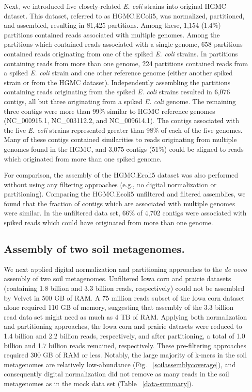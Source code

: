 \documentclass{pnastwo}
\begin{document}
\begin{article}
Next, we introduced five closely-related \emph{E. coli} strains into original
HGMC dataset. This dataset, referred to as HGMC.EColi5, was normalized,
partitioned, and assembled, resulting in 81,425 partitions. Among these, 1,154
(1.4\%) partitions contained reads associated with multiple genomes. Among the
partitions which contained reads associated with a single genome, 658 partitions
contained reads originating from one of the spiked \emph{E. coli} strains. In
partitions containing reads from more than one genome, 224 partitions contained
reads from a spiked \emph{E. coli} strain and one other reference genome (either
another spiked strain or from the HGMC dataset). Independently assembling the
partitions containing reads originating from the spiked \emph{E. coli} strains
resulted in 6,076 contigs, all but three originating from a spiked \emph{E.
coli} genome. The remaining three contigs were more than 99\% similar to HGMC
reference genomes (NC\_000915.1, NC\_003112.2, and NC\_009614.1). The contigs
associated with the five \emph{E. coli} strains represented greater than 98\% of
each of the five genomes. Many of these contigs contained similarities to reads
originating from multiple genomes found in the HGMC, and 3,075 contigs (51\%)
could be aligned to reads which originated from more than one spiked genome.

For comparison, the assembly of the HGMC.Ecoli5 dataset was also performed
without using any filtering approaches (e.g., no digital normalization or
partitioning). Comparing the HGMC.Ecoli5 unfiltered and filtered assemblies, we
found that the fraction of contigs which are associated with multiple genomes
were similar. In the unfiltered data set, 66\% of 4,702 contigs were associated
with spiked reads which could have originated from more than one genome.

\subsection*{Assembly of two soil metagenomes.} We next applied digital
normalization and partitioning approaches to the {\em de novo} assembly of two
soil metagenomes. Unfiltered Iowa corn and prairie datasets (containing 1.8
billion and 3.3 billion reads, respectively) could not be assembled by Velvet in
500 GB of RAM. A 75 million reads subset of the Iowa corn dataset alone required
110 GB of memory, suggesting that assembly of the 3.3 billion read data set
might need as much as 4 TB of RAM. Applying both normalization and partitioning approaches, 
the Iowa corn and prairie datasets were reduced to
1.4 billion and 2.2 billion reads, respectively, and after partitioning, a total
of 1.0 billion and 1.7 billion reads remained, respectively. These pre-filtering
approaches required 300 GB of RAM or less. Notably, the large majority of k-mers
in the soil metagenomes are relatively low-abundance (Fig.
~\ref{soilassemblycoverage}), and consequently digital normalization did not
remove as many reads in the soil metagenomes as in the mock data set (Table
~\ref{data-summary}).


\end{article}
\end{document}
